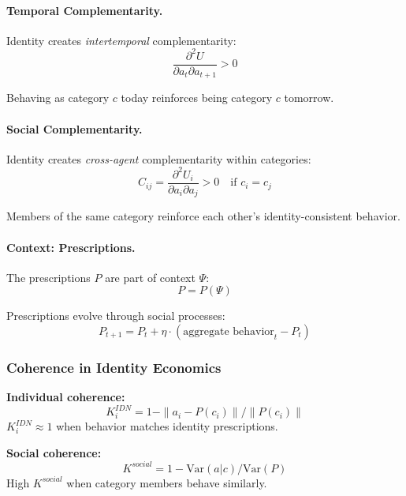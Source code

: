 \paragraph{Temporal Complementarity.}
Identity creates \emph{intertemporal} complementarity:
\begin{equation}
  \frac{\partial^2 U}{\partial a_t \partial a_{t+1}} > 0
\end{equation}

Behaving as category $c$ today reinforces being category $c$ tomorrow.

\paragraph{Social Complementarity.}
Identity creates \emph{cross-agent} complementarity within categories:
\begin{equation}
  C_{ij} = \frac{\partial^2 U_i}{\partial a_i \partial a_j} > 0 
  \quad \text{if } c_i = c_j
\end{equation}

Members of the same category reinforce each other's identity-consistent behavior.

\paragraph{Context: Prescriptions.}
The prescriptions $P$ are part of context $\Psi$:
\begin{equation}
  P = P(\Psi)
\end{equation}

Prescriptions evolve through social processes:
\begin{equation}
  P_{t+1} = P_t + \eta \cdot (\text{aggregate behavior}_t - P_t)
\end{equation}

\subsubsection{Coherence in Identity Economics}

\textbf{Individual coherence:}
\begin{equation}
  K_i^{IDN} = 1 - \|a_i - P(c_i)\| / \|P(c_i)\|
\end{equation}
$K_i^{IDN} \approx 1$ when behavior matches identity prescriptions.

\textbf{Social coherence:}
\begin{equation}
  K^{social} = 1 - \text{Var}(a | c) / \text{Var}(P)
\end{equation}
High $K^{social}$ when category members behave similarly.

